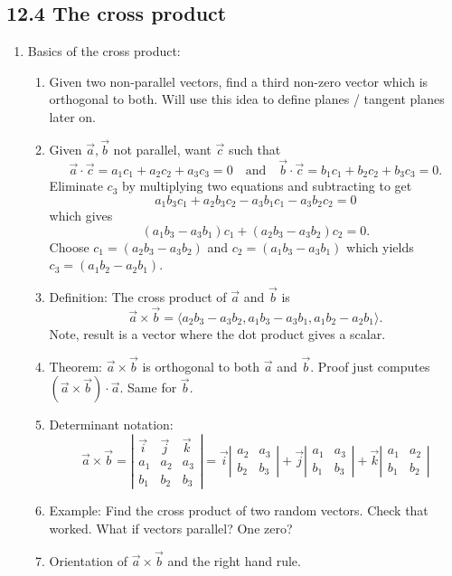 \documentclass{article}
\begin{document}
\subsection{12.4 The cross product}
\begin{enumerate}

\item Basics of the cross product:
\begin{enumerate}
\item Given two non-parallel vectors, find a third non-zero vector which is orthogonal to both. Will use this idea to define planes / tangent planes later on.
\item Given $\vec{a}, \vec{b}$ not parallel, want $\vec{c}$ such that
\[
\vec{a} \cdot \vec{c} = a_1c_1+a_2c_2+a_3c_3=0 \quad \text{and} \quad \vec{b} \cdot \vec{c} = b_1c_1+b_2c_2+b_3c_3=0.
\]
Eliminate $c_3$ by multiplying two equations and subtracting to get
\[
a_1b_3 c_1 + a_2b_3 c_2 - a_3b_1 c_1 - a_3b_2 c_2 = 0
\]
which gives
\[
(a_1b_3 - a_3b_1) c_1 + (a_2b_3 - a_3b_2) c_2 = 0.
\]
Choose $c_1 = (a_2b_3 - a_3b_2)$ and $c_2 = (a_1b_3 - a_3b_1)$ which yields $c_3 = (a_1b_2 - a_2b_1)$. 
\item Definition: The cross product of $\vec{a}$ and $\vec{b}$ is
\[
\vec{a} \times \vec{b} = \langle a_2b_3 - a_3b_2, a_1b_3 - a_3b_1, a_1b_2 - a_2b_1 \rangle.
\]
Note, result is a vector where the dot product gives a scalar.
\item Theorem: $\vec{a} \times \vec{b}$ is orthogonal to both $\vec{a}$ and $\vec{b}$. Proof just computes $(\vec{a} \times \vec{b}) \cdot \vec{a}$. Same for $\vec{b}$. 
\item Determinant notation:
\[
\vec{a} \times \vec{b} = \left|
\begin{array}{ccc}
\vec{i} & \vec{j} & \vec{k} \\
a_1 & a_2 & a_3 \\
b_1 & b_2 & b_3 
\end{array}
\right| 
= \vec{i}
\left|
\begin{array}{cc}
a_2 & a_3 \\
b_2 & b_3
\end{array}
\right| +
\vec{j}
\left|
\begin{array}{cc}
a_1 & a_3 \\
b_1 & b_3
\end{array}
\right| +
\vec{k}
\left|
\begin{array}{cc}
a_1 & a_2 \\
b_1 & b_2
\end{array}
\right|
\]
\item Example: Find the cross product of two random vectors. Check that worked. What if vectors parallel? One zero?
\item Orientation of $\vec{a} \times \vec{b}$ and the right hand rule.
\end{enumerate}


\end{enumerate}
\end{document}
